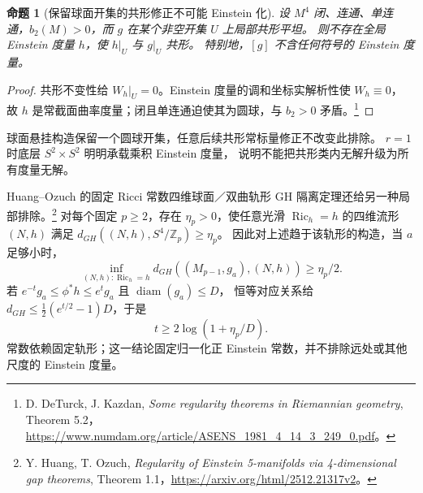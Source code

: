 \documentclass[UTF8,fontset=fandol,zihao=-4,oneside,openany]{ctexbook}
\theoremstyle{cjkplain}
\newtheorem{proposition}[theorem]{命题}
\numberwithin{equation}{chapter}
\DeclareMathOperator{\Ric}{Ric}
\begin{document}
\begin{proposition}[保留球面开集的共形修正不可能 Einstein 化]
设 \(M^4\) 闭、连通、单连通，\(b_2(M)>0\)，而 \(g\) 在某个非空开集 \(U\) 上局部共形平坦。
则不存在全局 Einstein 度量 \(h\)，使 \(h|_U\) 与 \(g|_U\) 共形。
特别地，\([g]\) 不含任何符号的 Einstein 度量。
\end{proposition}
\begin{proof}
共形不变性给 \(W_h|_U=0\)。Einstein 度量的调和坐标实解析性使 \(W_h\equiv0\)，
故 \(h\) 是常截面曲率度量；闭且单连通迫使其为圆球，与 \(b_2>0\) 矛盾。\footnote{D. DeTurck, J. Kazdan, \emph{Some regularity theorems in Riemannian geometry}, Theorem 5.2，\url{https://www.numdam.org/article/ASENS_1981_4_14_3_249_0.pdf}。}
\end{proof}
球面悬挂构造保留一个圆球开集，任意后续共形常标量修正不改变此排除。
\(r=1\) 时底层 \(S^2\times S^2\) 明明承载乘积 Einstein 度量，
说明不能把共形类内无解升级为所有度量无解。

Huang--Ozuch 的固定 Ricci 常数四维球面／双曲轨形 GH 隔离定理还给另一种局部排除。\footnote{Y. Huang, T. Ozuch, \emph{Regularity of Einstein 5-manifolds via 4-dimensional gap theorems}, Theorem 1.1，\url{https://arxiv.org/html/2512.21317v2}。}
对每个固定 \(p\ge2\)，存在 \(\eta_p>0\)，使任意光滑 \(\Ric_h=h\) 的四维流形 \((N,h)\) 满足
\(d_{GH}((N,h),S^4/\mathbb Z_p)\ge\eta_p\)。
因此对上述趋于该轨形的构造，当 \(a\) 足够小时，
\[
\inf_{(N,h):\Ric_h=h}d_{GH}((M_{p-1},g_a),(N,h))\ge\eta_p/2.
\]
若 \(e^{-t}g_a\le\phi^*h\le e^tg_a\) 且 \(\operatorname{diam}(g_a)\le D\)，
恒等对应关系给 \(d_{GH}\le\tfrac12(e^{t/2}-1)D\)，于是
\[
t\ge2\log(1+\eta_p/D).
\]
常数依赖固定轨形；这一结论固定归一化正 Einstein 常数，并不排除远处或其他尺度的 Einstein 度量。
\end{document}
